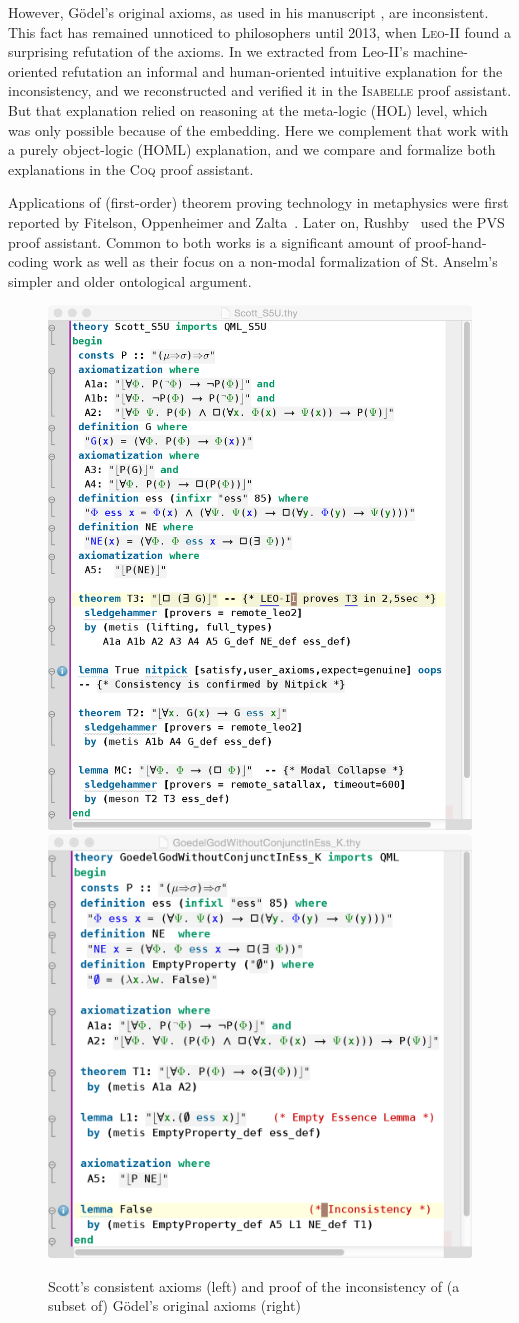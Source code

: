 \documentclass{llncs}
\newcommand{\logic}[1]{\textbf{#1}\xspace}
\newcommand{\SFiveU}{\logic{S5\textsuperscript{U}}}
\begin{document}
However, G\"odel's original axioms, as used in his
manuscript \cite{GoedelNotes}, are inconsistent. This fact has
remained unnoticed to philosophers until 2013, 
when \textsc{Leo-II} found a surprising refutation of the axioms.
In \cite{C55} we extracted from Leo-II's machine-oriented refutation an informal and human-oriented intuitive explanation for the inconsistency, and we reconstructed and
verified it in the \textsc{Isabelle} proof assistant. But that explanation relied on reasoning at the meta-logic (HOL) level, which was only possible because of the embedding. Here we complement that work with a purely object-logic (HOML) explanation, and we compare and formalize both explanations in the \textsc{Coq} proof assistant.

Applications of (first-order) theorem proving technology in
metaphysics were first reported by Fitelson, Oppenheimer and
Zalta~\cite{FitelsonZalta,oppenheimer11}. 
Later on, Rushby~\cite{rushby13} used the \textsc{PVS} proof
assistant. Common to both works is a
significant amount of proof-hand-coding work as well as their focus on
a non-modal formalization of St. Anselm's simpler
and older ontological argument.


\begin{figure}\centering 
  \includegraphics[width=.495\textwidth]{./Scott_S5U.png}
  \includegraphics[width=.495\textwidth]{./InconsistencyIsabelleK.png}
\caption{Scott's consistent axioms (left) and proof of the
  inconsistency of (a subset of) G\"odel's original  axioms (right)}
\label{Scott_Goedel}
\end{figure} 
\end{document}
